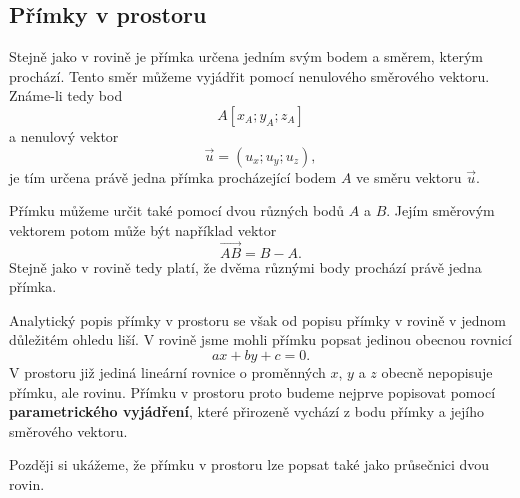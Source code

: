 \subsection{Přímky v prostoru}
\label{subsec:Lines_in_space}

Stejně jako v rovině je přímka určena jedním svým bodem a směrem,
kterým prochází. Tento směr můžeme vyjádřit pomocí nenulového
směrového vektoru. Známe-li tedy bod
\[
    A[x_A;y_A;z_A]
\]
a nenulový vektor
\[
    \vec{u}=(u_x;u_y;u_z),
\]
je tím určena právě jedna přímka procházející bodem $A$ ve směru
vektoru $\vec{u}$.

Přímku můžeme určit také pomocí dvou různých bodů $A$ a $B$.
Jejím směrovým vektorem potom může být například vektor
\[
    \overrightarrow{AB}=B-A.
\]
Stejně jako v rovině tedy platí, že dvěma různými body prochází právě
jedna přímka.

Analytický popis přímky v prostoru se však od popisu přímky v rovině
v jednom důležitém ohledu liší. V rovině jsme mohli přímku popsat
jedinou obecnou rovnicí
\[
    ax+by+c=0.
\]
V prostoru již jediná lineární rovnice o proměnných $x$, $y$ a $z$
obecně nepopisuje přímku, ale rovinu. Přímku v prostoru proto budeme
nejprve popisovat pomocí \textbf{parametrického vyjádření}, které
přirozeně vychází z bodu přímky a jejího směrového vektoru.

Později si ukážeme, že přímku v prostoru lze popsat také jako
průsečnici dvou rovin.